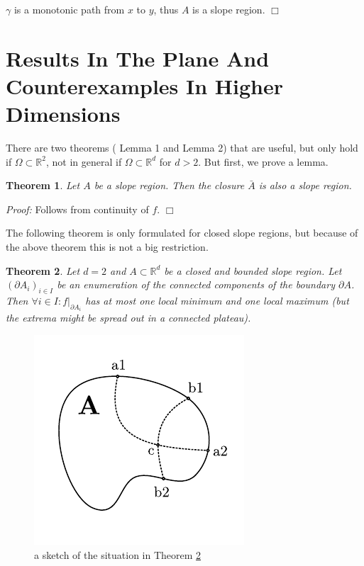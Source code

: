 \documentclass[11pt,twoside,twocolumn,a4paper]{article}
\theoremstyle{plain}
\newtheorem{thm}{Theorem}[section] %
\theoremstyle{definition}
\begin{document}
$\gamma$ is a monotonic path from $x$ to $y$, thus $A$ is a slope region.
\hfill $\Box$



\section{Results In The Plane And Counterexamples In Higher Dimensions}

There are two theorems (\;\!\!\cite{kropatsch2019computing} Lemma 1 and \cite{kropatsch2019computing} Lemma 2) that are useful, but only hold if $\Omega \subset \mathbb R^2$, not in general if $\Omega \subset \mathbb R^d$ for $d > 2$.
But first, we prove a lemma.

\begin{thm}
Let $A$ be a slope region.
Then the closure $\bar A$ is also a slope region.
\end{thm}

\emph{Proof:} Follows from continuity of $f$.
\hfill $\Box$

The following theorem is only formulated for closed slope regions, but because of the above theorem this is not a big restriction.

\begin{thm}
\label{uniqueminmax}
Let $d = 2$ and $A \subset \mathbb R^d$ be a closed and bounded slope region.
Let $(\partial A_i)_{i\in I}$ be an enumeration of the connected components of the boundary $\partial A$.
Then $\forall i \in I : f|_{\partial A_i}$ has at most one local minimum and one local maximum (but the extrema might be spread out in a connected plateau).
\end{thm}

\begin{figure}
\centering
\includegraphics[width=0.5\columnwidth]{img/sketch_border_thm.pdf}
\caption{a sketch of the situation in Theorem \ref{uniqueminmax}}
\label{fig:sketch_1}
\end{figure}
\end{document}
